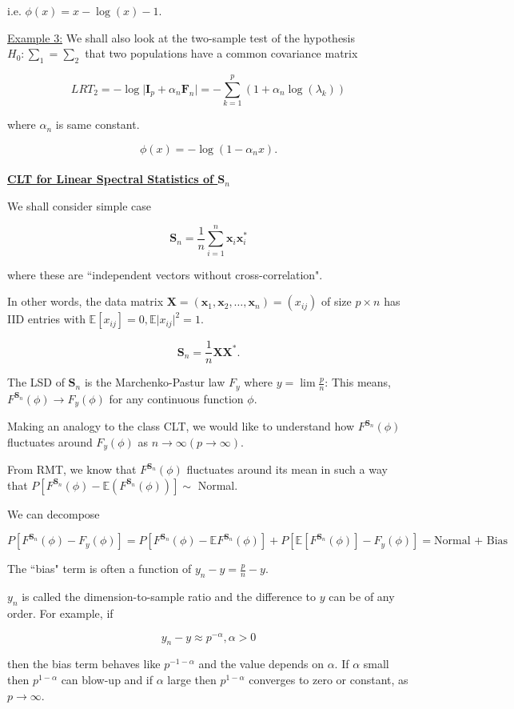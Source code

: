 \documentclass[twoside]{article}
\begin{document}
i.e. $\phi(x)=x-\log(x)-1$.

\underline{Example 3:} We shall also look at the two-sample test of the hypothesis $H_0:\sum_1=\sum_2$ that two populations have a common covariance matrix

$$LRT_2=-\log\lvert\mathbf{I}_p+\alpha_n\mathbf{F}_n\rvert = -\sum^p_{k=1}(1+\alpha_n\log(\lambda_k))$$

where $\alpha_n$ is same constant.

$$\phi(x)=-\log(1-\alpha_n x).$$\\

\underline{\textbf{CLT for Linear Spectral Statistics of $\mathbf{S}_n$}}

We shall consider simple case

$$\mathbf{S}_n=\frac{1}{n}\sum^n_{i=1}\mathbf{x}_i\mathbf{x}_i^*$$

where these are ``independent vectors without cross-correlation".

In other words, the data matrix $\mathbf{X}=(\mathbf{x}_1,\mathbf{x}_2,\dots, \mathbf{x}_n)=(x_{ij})$ of size $p\times n$ has IID entries with $\mathbb{E}[x_{ij}]=0,\mathbb{E}\lvert x_{ij}\rvert^2=1.$

$$\mathbf{S}_n=\frac{1}{n}\mathbf{X}\mathbf{X}^*.$$

The LSD of $\mathbf{S}_n$ is the Marchenko-Pastur law $F_y$ where $y=\lim\frac{p}{n}$: This means, $F^{\mathbf{S}_n}(\phi)\to F_y(\phi)$ for any continuous function $\phi$.

Making an analogy to the class CLT, we would like to understand how $F^{\mathbf{S}_n}(\phi)$ fluctuates around $F_y(\phi)$ as $n\to\infty (p\to \infty)$. 

From RMT, we know that $F^{\mathbf{S}_n}(\phi)$ fluctuates around its mean in such a way that $P[F^{\mathbf{S}_n}(\phi)-\mathbb{E}(F^{\mathbf{S}_n}(\phi))]\sim$ Normal.

We can decompose

$$P[F^{\mathbf{S}_n}(\phi)-F_y(\phi)]=P[F^{\mathbf{S}_n}(\phi)-\mathbb{E}F^{\mathbf{S}_n}(\phi)]+P[\mathbb{E}[F^{\mathbf{S}_n}(\phi)]-F_y(\phi)]=\text{Normal + Bias}$$

The ``bias" term is often a function of $y_n-y=\frac{p}{n}-y.$

$y_n$ is called the dimension-to-sample ratio and the difference to $y$ can be of any order. For example, if

$$y_n-y\approx p^{-\alpha}, \alpha>0$$

then the bias term behaves like $p^{-1-\alpha}$ and the value depends on $\alpha$. If $\alpha$ small then $p^{1-\alpha}$ can blow-up and if $\alpha$ large then $p^{1-\alpha}$ converges to zero or constant, as $p\to\infty$.
\end{document}
